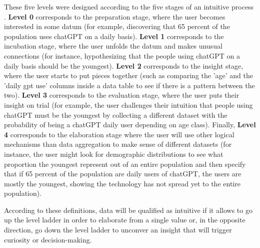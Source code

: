 \documentclass[12pt,a4paper]{article}
\begin{document}
\noindent These five levels were designed according to the five stages of an intuitive process \citep{csikszentmihalyi1997flow}. \textbf{Level 0} corresponds to the preparation stage, where the user becomes interested in some datum (for example, discovering that 65 percent of the population uses chatGPT on a daily basis). \textbf{Level 1} corresponds to the incubation stage, where the user unfolds the datum and makes unusual connections (for instance, hypothesizing that the people using chatGPT on a daily basis should be the youngest). \textbf{Level 2} corresponds to the insight stage, where the user starts to put pieces together (such as comparing the 'age' and the 'daily gpt use' columns inside a data table to see if there is a pattern between the two). \textbf{Level 3} corresponds to the evaluation stage, where the user puts their insight on trial (for example, the user challenges their intuition that people using chatGPT must be the youngest by collecting a different dataset with the probability of being a chatGPT daily user depending on age class). Finally, \textbf{Level 4} corresponds to the elaboration stage where the user will use other logical mechanisms than data aggregation to make sense of different datasets (for instance, the user might look for demographic distributions to see what proportion the youngest represent out of an entire population and then specify that if 65 percent of the population are daily users of chatGPT, the users are mostly the youngest, showing the technology has not spread yet to the entire population).

\vspace{1em}

\noindent According to these definitions, data will be qualified as intuitive if it allows to go up the level ladder in order to elaborate from a single value or, in the opposite direction, go down the level ladder to unconver an insight that will trigger curiosity or decision-making.

\vspace{1em}
\end{document}
